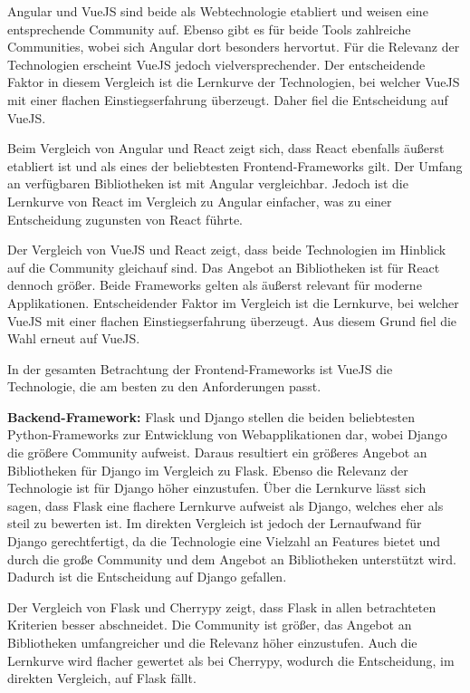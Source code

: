 Angular und VueJS sind beide als Webtechnologie etabliert und weisen eine entsprechende Community auf.
Ebenso gibt es für beide Tools zahlreiche Communities, wobei sich Angular dort besonders hervortut.
Für die Relevanz der Technologien erscheint VueJS jedoch vielversprechender.
Der entscheidende Faktor in diesem Vergleich ist die Lernkurve der Technologien, bei welcher VueJS mit einer flachen Einstiegserfahrung überzeugt.%
Daher fiel die Entscheidung auf VueJS.

Beim Vergleich von Angular und React zeigt sich, dass React ebenfalls äußerst etabliert ist und als eines der beliebtesten Frontend-Frameworks gilt.%
Der Umfang an verfügbaren Bibliotheken ist mit Angular vergleichbar.
Jedoch ist die Lernkurve von React im Vergleich zu Angular einfacher, was zu einer Entscheidung zugunsten von React führte.%

Der Vergleich von VueJS und React zeigt, dass beide Technologien im Hinblick auf die Community gleichauf sind.%
Das Angebot an Bibliotheken ist für React dennoch größer.%
Beide Frameworks gelten als äußerst relevant für moderne Applikationen.%
Entscheidender Faktor im Vergleich ist die Lernkurve, bei welcher VueJS mit einer flachen Einstiegserfahrung überzeugt.%
Aus diesem Grund fiel die Wahl erneut auf VueJS.

In der gesamten Betrachtung der Frontend-Frameworks ist VueJS die Technologie, die am besten zu den Anforderungen passt.

\newpage
\textbf{Backend-Framework:}
Flask und Django stellen die beiden beliebtesten Python-Frameworks zur Entwicklung von Webapplikationen dar, wobei Django die größere Community aufweist.%
Daraus resultiert ein größeres Angebot an Bibliotheken für Django im Vergleich zu Flask.%
Ebenso die Relevanz der Technologie ist für Django höher einzustufen.%
Über die Lernkurve lässt sich sagen, dass Flask eine flachere Lernkurve aufweist als Django, welches eher als steil zu bewerten ist.%
Im direkten Vergleich ist jedoch der Lernaufwand für Django gerechtfertigt, da die Technologie eine Vielzahl an Features bietet und durch die große Community und dem Angebot an Bibliotheken unterstützt wird.
Dadurch ist die Entscheidung auf Django gefallen.

Der Vergleich von Flask und Cherrypy zeigt, dass Flask in allen betrachteten Kriterien besser abschneidet.
Die Community ist größer, das Angebot an Bibliotheken umfangreicher und die Relevanz höher einzustufen.%
Auch die Lernkurve wird flacher gewertet als bei Cherrypy, wodurch die Entscheidung, im direkten Vergleich, auf Flask fällt.%


